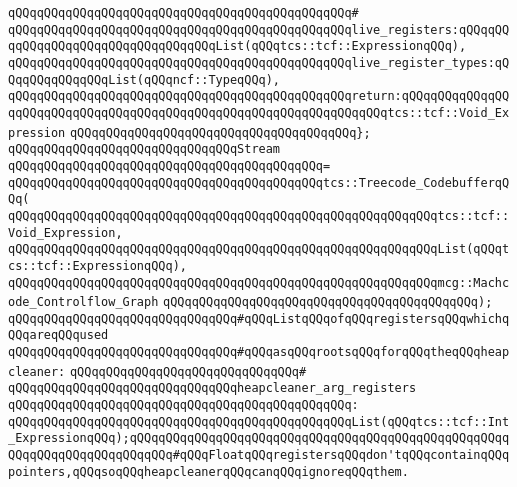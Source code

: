 \verb|qQQqqQQqqQQqqQQqqQQqqQQqqQQqqQQqqQQqqQQqqQQqqQQq#|\newline
\verb|qQQqqQQqqQQqqQQqqQQqqQQqqQQqqQQqqQQqqQQqqQQqqQQqlive_registers:qQQqqQQqqQQqqQQqqQQqqQQqqQQqqQQqqQQqList(qQQqtcs::tcf::ExpressionqQQq),|\newline
\verb|qQQqqQQqqQQqqQQqqQQqqQQqqQQqqQQqqQQqqQQqqQQqqQQqlive_register_types:qQQqqQQqqQQqqQQqList(qQQqncf::TypeqQQq),|\newline
\verb|qQQqqQQqqQQqqQQqqQQqqQQqqQQqqQQqqQQqqQQqqQQqqQQqreturn:qQQqqQQqqQQqqQQqqQQqqQQqqQQqqQQqqQQqqQQqqQQqqQQqqQQqqQQqqQQqqQQqqQQqtcs::tcf::Void_Expression|\newline
\verb|qQQqqQQqqQQqqQQqqQQqqQQqqQQqqQQqqQQqqQQq};|\newline
\newline
\verb|qQQqqQQqqQQqqQQqqQQqqQQqqQQqqQQqStream|\newline
\verb|qQQqqQQqqQQqqQQqqQQqqQQqqQQqqQQqqQQqqQQqqQQq=|\newline
\verb|qQQqqQQqqQQqqQQqqQQqqQQqqQQqqQQqqQQqqQQqqQQqtcs::Treecode_CodebufferqQQq(|\newline
\verb|qQQqqQQqqQQqqQQqqQQqqQQqqQQqqQQqqQQqqQQqqQQqqQQqqQQqqQQqqQQqtcs::tcf::Void_Expression,|\newline
\verb|qQQqqQQqqQQqqQQqqQQqqQQqqQQqqQQqqQQqqQQqqQQqqQQqqQQqqQQqqQQqList(qQQqtcs::tcf::ExpressionqQQq),|\newline
\verb|qQQqqQQqqQQqqQQqqQQqqQQqqQQqqQQqqQQqqQQqqQQqqQQqqQQqqQQqqQQqmcg::Machcode_Controlflow_Graph|\newline
\verb|qQQqqQQqqQQqqQQqqQQqqQQqqQQqqQQqqQQqqQQqqQQq);|\newline
\newline
\newline
\verb|qQQqqQQqqQQqqQQqqQQqqQQqqQQqqQQq#qQQqListqQQqofqQQqregistersqQQqwhichqQQqareqQQqused|\newline
\verb|qQQqqQQqqQQqqQQqqQQqqQQqqQQqqQQq#qQQqasqQQqrootsqQQqforqQQqtheqQQqheapcleaner:|\newline
\verb|qQQqqQQqqQQqqQQqqQQqqQQqqQQqqQQq#|\newline
\verb|qQQqqQQqqQQqqQQqqQQqqQQqqQQqqQQqheapcleaner_arg_registers|\newline
\verb|qQQqqQQqqQQqqQQqqQQqqQQqqQQqqQQqqQQqqQQqqQQqqQQq:|\newline
\verb|qQQqqQQqqQQqqQQqqQQqqQQqqQQqqQQqqQQqqQQqqQQqqQQqList(qQQqtcs::tcf::Int_ExpressionqQQq);qQQqqQQqqQQqqQQqqQQqqQQqqQQqqQQqqQQqqQQqqQQqqQQqqQQqqQQqqQQqqQQqqQQqqQQqqQQq#qQQqFloatqQQqregistersqQQqdon'tqQQqcontainqQQqpointers,qQQqsoqQQqheapcleanerqQQqcanqQQqignoreqQQqthem.|\newline
